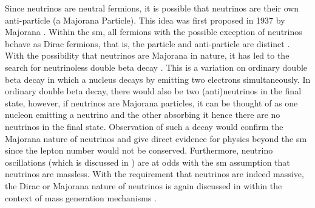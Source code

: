 Since neutrinos are neutral fermions, it is possible that neutrinos are their own anti-particle (a Majorana Particle). This idea was first proposed in 1937 by Majorana \cite{Majorana2020}. Within the \Gls{sm}, all fermions with the possible exception of neutrinos behave as Dirac fermions, that is, the particle and anti-particle are distinct \cite{dirac_majorana_neutrinos}. With the possibility that neutrinos are Majorana in nature, it has led to the search for neutrinoless double beta decay \cite{Double_beta_decay}. This is a variation on ordinary double beta decay in which a nucleus decays by emitting two electrons simultaneously. In ordinary double beta decay, there would also be two (anti)neutrinos in the final state, however, if neutrinos are Majorana particles, it can be thought of as one nucleon emitting a neutrino and the other absorbing it hence there are no neutrinos in the final state. Observation of such a decay would confirm the Majorana nature of neutrinos and give direct evidence for physics beyond the \Gls{sm} since the lepton number would not be conserved. Furthermore, neutrino oscillations (which is discussed in ) are at odds with the \gls{sm} assumption that neutrinos are massless. With the requirement that neutrinos are indeed massive, the Dirac or Majorana nature of neutrinos is again discussed in  within the context of mass generation mechanisms \cite{The_physics_of_neutrinos_book}.

